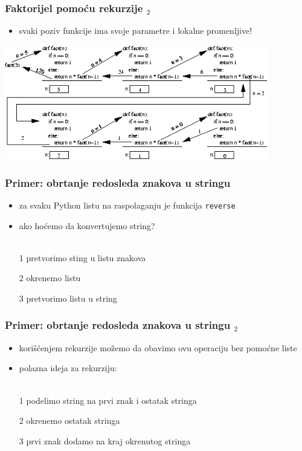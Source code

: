 \documentclass[utf8,compress,aspectratio=169]{beamer}
\begin{document}
\begin{frame}[fragile]
  \frametitle{Faktorijel pomoću rekurzije $_2$}
  \begin{itemize}
    \item svaki poziv funkcije ima svoje parametre i lokalne promenljive!
  \end{itemize}
  \begin{center}
    \includegraphics[width=11.5cm]{pic26}
  \end{center}
\end{frame}

\begin{frame}[fragile]
  \frametitle{Primer: obrtanje redosleda znakova u stringu}
  \begin{itemize}
    \item za svaku Python listu na raspolaganju je funkcija \texttt{reverse}
    \item ako hoćemo da konvertujemo string? \\ \ \\
    \item[1] pretvorimo sting u listu znakova
    \item[2] okrenemo listu
    \item[3] pretvorimo listu u string
  \end{itemize}
\end{frame}

\begin{frame}[fragile]
  \frametitle{Primer: obrtanje redosleda znakova u stringu $_2$}
  \begin{itemize}
    \item korišćenjem rekurzije možemo da obavimo ovu operaciju bez pomoćne liste
    \item polazna ideja za rekurziju: \\ \ \\
    \item[1] podelimo string na prvi znak i ostatak stringa
    \item[2] okrenemo ostatak stringa
    \item[3] prvi znak dodamo na kraj okrenutog stringa
  \end{itemize}
\end{frame}
\end{document}
